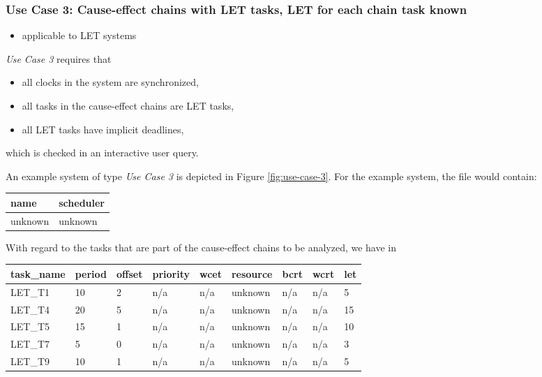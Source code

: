 \subsubsection{Use Case 3: Cause-effect chains with LET tasks, LET for each chain task known}
\label{sec:input-files-let}
%
\begin{tcolorbox}
\begin{itemize}[leftmargin=*, itemsep=0pt]
	\item applicable to LET systems
\end{itemize}
\end{tcolorbox}
\bigskip

\emph{Use Case 3} requires that
\begin{itemize}[leftmargin=*, itemsep=0pt]
	\item all clocks in the system are synchronized,
	\item all tasks in the cause-effect chains are LET tasks,
	\item all LET tasks have implicit deadlines,	
\end{itemize}
which is checked in an interactive user query.
\bigskip

An example system of type \emph{Use Case 3} is depicted in Figure \ref{fig:use-case-3}.
For the example system, the file  would contain:
\begin{center}
	\begin{tabular}{|l|l|} \hline
		\textbf{name} & \textbf{scheduler} \\ \hline
		unknown & unknown \\ \hline
	\end{tabular}
\end{center}
With regard to the tasks that are part of the cause-effect chains to be analyzed, we have in  
\begin{center}
	\begin{tabular}{|l|l|l|l|l|l|l|l|l|} \hline
		  \textbf{task\_name}  
		& \textbf{period} 
		& \textbf{offset} 
		& \textbf{priority}
		& \textbf{wcet}
		& \textbf{resource} 
		& \textbf{bcrt}		
		& \textbf{wcrt}
		& \textbf{let} \\ \hline
	LET\_T1&10&2&n/a&n/a&unknown&n/a&n/a&5 \\ \hline
	LET\_T4&20&5&n/a&n/a&unknown&n/a&n/a&15 \\ \hline
	LET\_T5&15&1&n/a&n/a&unknown&n/a&n/a&10 \\ \hline
	LET\_T7&5&0&n/a&n/a&unknown&n/a&n/a&3 \\ \hline
	LET\_T9&10&1&n/a&n/a&unknown&n/a&n/a&5 \\ \hline		
	\end{tabular}
\end{center}

